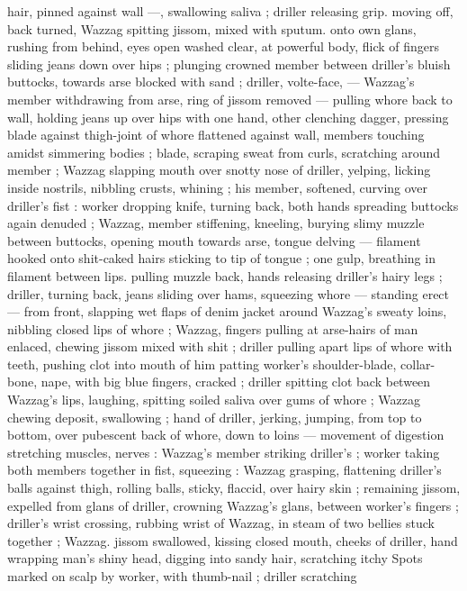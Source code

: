 hair, pinned against wall ---, swallowing saliva ; driller releasing grip. 
moving off, back turned, Wazzag spitting jissom, mixed with sputum. 
onto own glans, rushing from behind, eyes open washed clear, at 
powerful body, flick of fingers sliding jeans down over hips ; plunging 
crowned member between driller's bluish buttocks, towards arse 
blocked with sand ; driller, volte-face, --- Wazzag's member 
withdrawing from arse, ring of jissom removed --- pulling whore back 
to wall, holding jeans up over hips with one hand, other clenching 
dagger, pressing blade against thigh-joint of whore flattened against 
wall, members touching amidst simmering bodies ; blade, scraping 
sweat from curls, scratching around member ; Wazzag slapping 
mouth over snotty nose of driller, yelping, licking inside nostrils, 
nibbling crusts, whining ; his member, softened, curving over driller's 
fist : worker dropping knife, turning back, both hands spreading 
buttocks again denuded ; Wazzag, member stiffening, kneeling, 
burying slimy muzzle between buttocks, opening mouth towards 
arse, tongue delving --- filament hooked onto shit-caked hairs 
sticking to tip of tongue ; one gulp, breathing in filament between 
lips. pulling muzzle back, hands releasing driller's hairy legs ; driller, 
turning back, jeans sliding over hams, squeezing whore --- standing 
erect --- from front, slapping wet flaps of denim jacket around 
Wazzag's sweaty loins, nibbling closed lips of whore ; Wazzag, 
fingers pulling at arse-hairs of man enlaced, chewing jissom mixed 
with shit ; driller pulling apart lips of whore with teeth, pushing clot 
into mouth of him patting worker's shoulder-blade, collar-bone, 
nape, with big blue fingers, cracked ; driller spitting clot back 
between Wazzag's lips, laughing, spitting soiled saliva over gums of 
whore ; Wazzag chewing deposit, swallowing ; hand of driller, jerking, 
jumping, from top to bottom, over pubescent back of whore, down to 
loins --- movement of digestion stretching muscles, nerves : 
Wazzag's member striking driller's ; worker taking both members 
together in fist, squeezing : Wazzag grasping, flattening driller's 
balls against thigh, rolling balls, sticky, flaccid, over hairy skin ; 
remaining jissom, expelled from glans of driller, crowning Wazzag's 
glans, between worker's fingers ; driller's wrist crossing, rubbing 
wrist of Wazzag, in steam of two bellies stuck together ; Wazzag. 
jissom swallowed, kissing closed mouth, cheeks of driller, hand 
wrapping man's shiny head, digging into sandy hair, scratching itchy 
Spots marked on scalp by worker, with thumb-nail ; driller scratching 
